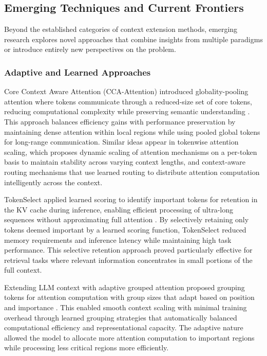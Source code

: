 \documentclass[11pt,letterpaper]{article}
\begin{document}
\subsection{Emerging Techniques and Current Frontiers}

Beyond the established categories of context extension methods, emerging research explores novel approaches that combine insights from multiple paradigms or introduce entirely new perspectives on the problem.

\subsubsection{Adaptive and Learned Approaches}

Core Context Aware Attention (CCA-Attention) introduced globality-pooling attention where tokens communicate through a reduced-size set of core tokens, reducing computational complexity while preserving semantic understanding \cite{zhang2024core}. This approach balances efficiency gains with performance preservation by maintaining dense attention within local regions while using pooled global tokens for long-range communication. Similar ideas appear in tokenwise attention scaling, which proposes dynamic scaling of attention mechanisms on a per-token basis to maintain stability across varying context lengths, and context-aware routing mechanisms that use learned routing to distribute attention computation intelligently across the context.

TokenSelect applied learned scoring to identify important tokens for retention in the KV cache during inference, enabling efficient processing of ultra-long sequences without approximating full attention \cite{jiang2025tokenselect}. By selectively retaining only tokens deemed important by a learned scoring function, TokenSelect reduced memory requirements and inference latency while maintaining high task performance. This selective retention approach proved particularly effective for retrieval tasks where relevant information concentrates in small portions of the full context.

Extending LLM context with adaptive grouped attention proposed grouping tokens for attention computation with group sizes that adapt based on position and importance \cite{chang2025extending}. This enabled smooth context scaling with minimal training overhead through learned grouping strategies that automatically balanced computational efficiency and representational capacity. The adaptive nature allowed the model to allocate more attention computation to important regions while processing less critical regions more efficiently.
\end{document}
